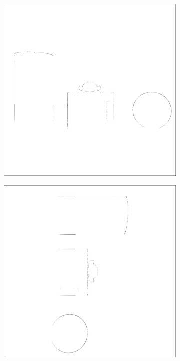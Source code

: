 \begin{figure}[H]
    \begin{subfigure}[t]{0.32\textwidth}
        \includegraphics[width=\linewidth]{chapter04/img/flexion-0001.png}
    \end{subfigure}
    \begin{subfigure}[t]{0.32\textwidth}
        \includegraphics[width=\linewidth]{chapter04/img/flexion-0030.png}

\end{subfigure}
\end{figure}
